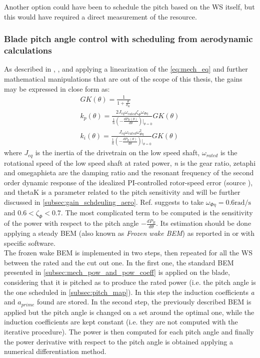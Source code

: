 Another option could have been to schedule the pitch based on the \acrshort{WS} itself, but this would have required a direct measurement of the resource. 

\subsubsection{Blade pitch angle control with scheduling from aerodynamic calculations}\label{subsec:gain_schdeuling_aero}
As described in \cite{Aerodynamics_of_wind_turbines}, \cite{NREL_5MW_reference}, and \cite{ris_r_1500} applying a linearization of the \autoref{eq:mech_eq} and further mathematical manipulations that are out of the scope of this thesis,  the gains may be expressed in close form as:
\begin{gather}
    GK(\theta) = \frac{1}{1+\frac{\theta}{\theta_K}} \label{eq:GK}\\
    k_p(\theta) = \frac{2J_{eq}\omega_{rated}\zeta_{\Phi}\omega_{\Phi\eta}}{\frac{1}{n}\left(-\frac{dP_R(\theta)}{d\theta}\right)\lvert_{\theta=0}}GK(\theta)
    \label{eq:kp}\\
    k_i(\theta) = \frac{J_{eq}\omega_{rated}\omega_{\Phi\eta}^2}{\frac{1}{n}\left(-\frac{dP_R(\theta)}{d\theta}\right)\lvert_{\theta=0}}GK(\theta)
    \label{eq:ki}
\end{gather}
where $J_{eq}$ is the inertia of the drivetrain on the low speed shaft, $\omega_{rated}$ is the rotational speed of the low speed shaft at rated power, \textit{n} is the gear ratio, \acrshort{zetaphi} and \acrshort{omegaphieta} are the damping ratio and the resonant frequency of the second order dynamic response of the idealized PI-controlled rotor-speed error (source \cite{NREL_5MW_reference}), and \acrshort{thetaK} is a parameter related to the pitch sensitivity and will be further discussed in \autoref{subsec:gain_schdeuling_aero}. Ref. \cite{NREL_5MW_reference} suggests to take $\omega_{\Phi\eta}=0.6\si{\radian\per\second}$ and $0.6<\zeta_{\Phi}<0.7$. The most complicated term to be computed is the sensitivity of the power with respect to the pitch angle $-\frac{dP_R}{d\theta}$. Its estimation should be done applying a steady \acrshort{BEM} (also known as \textit{Frozen wake BEM}) as reported in \cite{Aerodynamics_of_wind_turbines} or with specific software. \\
The frozen wake BEM is implemented in two steps, then repeated for all the \acrshort{WS} between the rated and the cut out one. In the first one, the standard BEM presented in \autoref{subsec:mech_pow_and_pow_coeff} is applied on the blade, considering that it is pitched as to produce the rated power (i.e. the pitch angle is the one scheduled in \autoref{subsec:pitch_map}). In this step the induction coefficients \textit{a} and \textit{$a_{prime}$} found are stored. In the second step, the previously described BEM is applied but the pitch angle is changed on a set around the optimal one, while the induction coefficients are kept constant (i.e. they are not computed with the iterative procedure). The power is then computed for each pitch angle and finally the power derivative with respect to the pitch angle is obtained applying a numerical differentiation method.

